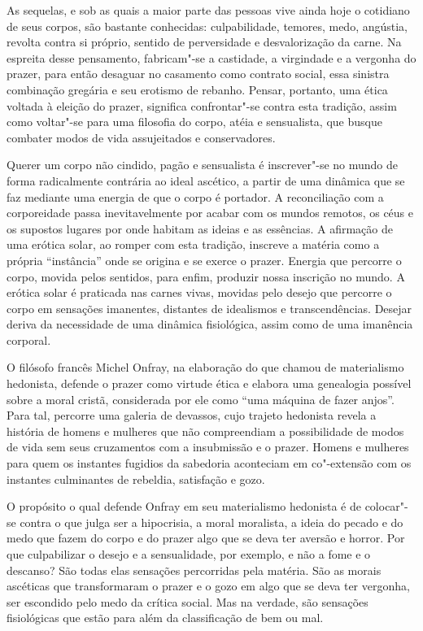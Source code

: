 As sequelas, e sob as quais a maior parte das pessoas vive ainda hoje o
cotidiano de seus corpos, são bastante conhecidas: culpabilidade,
temores, medo, angústia, revolta contra si próprio, sentido de
perversidade e desvalorização da carne. Na espreita desse pensamento,
fabricam"-se a castidade, a virgindade e a vergonha do prazer, para então
desaguar no casamento como contrato social, essa sinistra combinação
gregária e seu erotismo de rebanho. Pensar, portanto, uma ética voltada
à eleição do prazer, significa confrontar"-se contra esta tradição, assim
como voltar"-se para uma filosofia do corpo, atéia e sensualista, que
busque combater modos de vida assujeitados e conservadores.

Querer um corpo não cindido, pagão e sensualista é inscrever"-se no mundo
de forma radicalmente contrária ao ideal ascético, a partir de uma
dinâmica que se faz mediante uma energia de que o corpo é portador. A
reconciliação com a corporeidade passa inevitavelmente por acabar com os
mundos remotos, os céus e os supostos lugares por onde habitam as ideias
e as essências. A afirmação de uma erótica solar, ao romper com esta
tradição, inscreve a matéria como a própria ``instância'' onde se
origina e se exerce o prazer. Energia que percorre o corpo, movida pelos
sentidos, para enfim, produzir nossa inscrição no mundo. A erótica solar
é praticada nas carnes vivas, movidas pelo desejo que percorre o corpo
em sensações imanentes, distantes de idealismos e transcendências.
Desejar deriva da necessidade de uma dinâmica fisiológica, assim como de
uma imanência corporal.

O filósofo francês Michel Onfray, na elaboração do que chamou de
materialismo hedonista, defende o prazer como virtude ética e elabora
uma genealogia possível sobre a moral cristã, considerada por ele como
``uma máquina de fazer anjos''. Para tal, percorre uma galeria de
devassos, cujo trajeto hedonista revela a história de homens e mulheres
que não compreendiam a possibilidade de modos de vida sem seus
cruzamentos com a insubmissão e o prazer. Homens e mulheres para quem os
instantes fugidios da sabedoria aconteciam em co"-extensão com os
instantes culminantes de rebeldia, satisfação e gozo.

O propósito o qual defende Onfray em seu materialismo hedonista é de
colocar"-se contra o que julga ser a hipocrisia, a moral moralista, a
ideia do pecado e do medo que fazem do corpo e do prazer algo que se
deva ter aversão e horror. Por que culpabilizar o desejo e a
sensualidade, por exemplo, e não a fome e o descanso? São todas elas
sensações percorridas pela matéria. São as morais ascéticas que
transformaram o prazer e o gozo em algo que se deva ter vergonha, ser
escondido pelo medo da crítica social. Mas na verdade, são sensações
fisiológicas que estão para além da classificação de bem ou mal.

